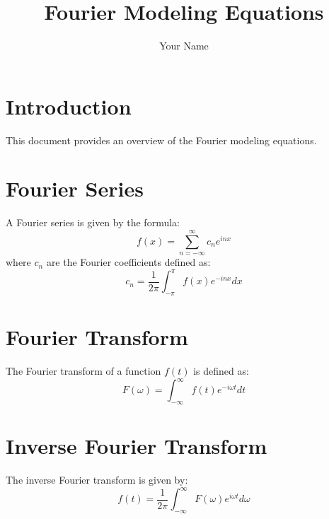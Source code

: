 \documentclass{article}
\begin{document}
\title{Fourier Modeling Equations}
\author{Your Name}
\maketitle

\section{Introduction}
This document provides an overview of the Fourier modeling equations.

\section{Fourier Series}
A Fourier series is given by the formula:
\[
    f(x) = \sum_{n=-\infty}^{\infty} c_n e^{inx}
\]
where \(c_n\) are the Fourier coefficients defined as:
\[
    c_n = \frac{1}{2\pi} \int_{-\pi}^{\pi} f(x) e^{-inx} dx
\]

\section{Fourier Transform}
The Fourier transform of a function \(f(t)\) is defined as:
\[
    F(\omega) = \int_{-\infty}^{\infty} f(t) e^{-i\omega t} dt
\]

\section{Inverse Fourier Transform}
The inverse Fourier transform is given by:
\[
    f(t) = \frac{1}{2\pi} \int_{-\infty}^{\infty} F(\omega) e^{i\omega t} d\omega
\]
\end{document}

